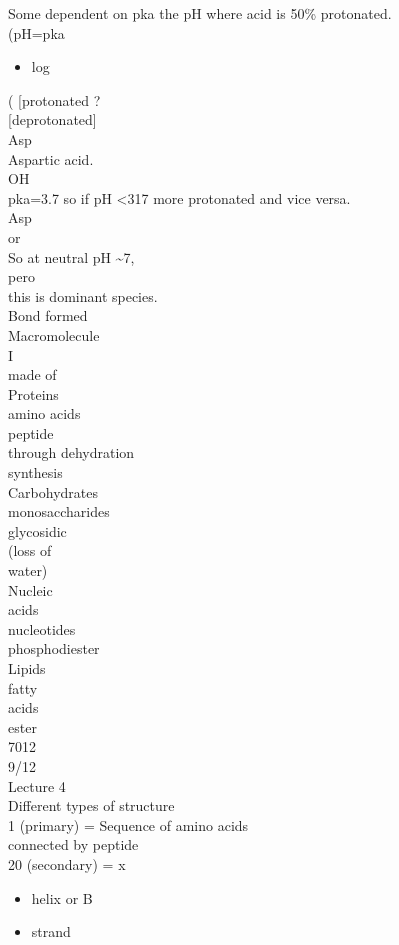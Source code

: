\documentclass{article}
\begin{document}
Some dependent on pka the pH where acid is 50\% protonated.\\
(pH=pka \begin{itemize}\item  log
\end{itemize}
( {[}protonated ?\\
{[}deprotonated{]}\\
Asp\\
Aspartic acid.\\
OH\\
pka=3.7 so if pH <317 more protonated and vice versa.\\
Asp\\
or\\
So at neutral pH \textasciitilde7,\\
pero\\
this is dominant species.\\
Bond formed\\
Macromolecule\\
I\\
made of\\
Proteins\\
amino acids\\
peptide\\
through dehydration\\
synthesis\\
Carbohydrates\\
monosaccharides\\
glycosidic\\
(loss of\\
water)\\
Nucleic\\
acids\\
nucleotides\\
phosphodiester\\
Lipids\\
fatty\\
acids\\
ester\\
7012\\
9/12\\
Lecture 4\\
Different types of structure\\
1 (primary) = Sequence of amino acids\\
connected by peptide\\
20 (secondary) = x\begin{itemize}\item helix or B\item strand
\end{itemize}
\end{document}
